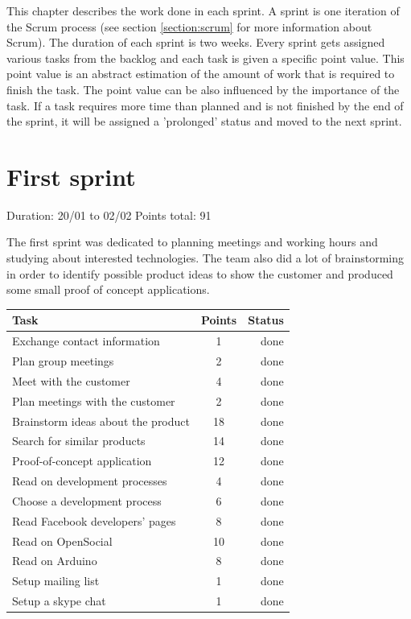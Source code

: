 
This chapter describes the work done in each sprint. A sprint is one iteration of the Scrum process
(see section \ref{section:scrum} for more information about Scrum). The duration of each sprint is two weeks.
Every sprint gets assigned various tasks from the backlog and each task is given a specific point value.
This point value is an abstract estimation of the amount of work that is required to finish the task.
The point value can be also influenced by the importance of the task. If a task requires more time than
planned and is not finished by the end of the sprint, it will be assigned a 'prolonged' status and
moved to the next sprint.

\newpage

\section{First sprint}

Duration: 20/01 to 02/02
Points total: 91

The first sprint was dedicated to planning meetings and working hours
and studying about interested technologies. The team also did a lot of
brainstorming in order to identify possible product ideas to show the
customer and produced some small proof of concept applications.

\begin{table}[ht!]
\begin{tabular}{ | l | c | r | }

\hline
\textbf{Task} & \textbf{Points} & \textbf{Status} \\
\hline

Exchange contact information		& 1  & done \\
\hline
Plan group meetings					& 2  & done \\
\hline
Meet with the customer				& 4  & done \\
\hline
Plan meetings with the customer		& 2  & done \\
\hline
Brainstorm ideas about the product	& 18 & done \\
\hline
Search for similar products			& 14 & done \\
\hline
Proof-of-concept application		& 12 & done \\
\hline
Read on development processes		& 4  & done \\
\hline
Choose a development process		& 6  & done \\
\hline
Read Facebook developers' pages		& 8  & done \\
\hline
Read on OpenSocial					& 10 & done \\
\hline
Read on Arduino						& 8  & done \\
\hline
Setup mailing list					& 1  & done \\
\hline
Setup a skype chat					& 1  & done \\
\hline

\end{tabular}
\end{table}

